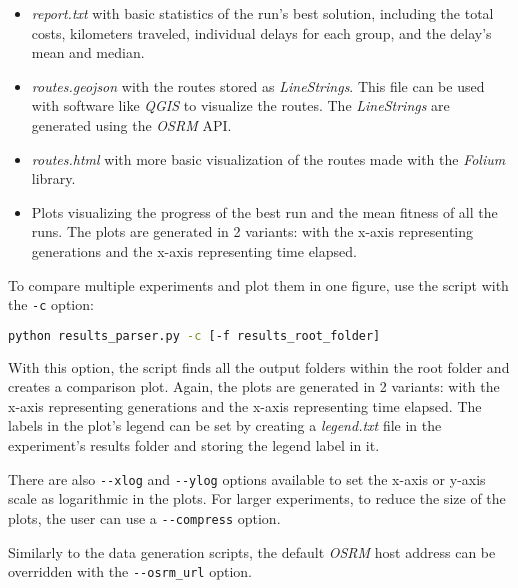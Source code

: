 \begin{itemize}
    \setlength\itemsep{0pt}
    \item \textit{report.txt} with basic statistics of the run's best solution, including the total costs, kilometers traveled, individual delays for each group, and the delay's mean and median.
    \item \textit{routes.geojson} with the routes stored as \textit{LineStrings}. This file can be used with software like \textit{QGIS} to visualize the routes. The \textit{LineStrings} are generated using the \textit{OSRM} API.
    \item \textit{routes.html} with more basic visualization of the routes made with the \textit{Folium} library.
    \item Plots visualizing the progress of the best run and the mean fitness of all the runs. The plots are generated in 2 variants: with the x-axis representing generations and the x-axis representing time elapsed.
\end{itemize}

To compare multiple experiments and plot them in one figure, use the script with the \texttt{-c} option:

\begin{lstlisting}[language=bash]
    python results_parser.py -c [-f results_root_folder] 
\end{lstlisting}

With this option, the script finds all the output folders within the root folder and creates a comparison plot. Again, the plots are generated in 2 variants: with the x-axis representing generations and the x-axis representing time elapsed. The labels in the plot's legend can be set by creating a \textit{legend.txt} file in the experiment's results folder and storing the legend label in it.

There are also \texttt{-{}-xlog} and \texttt{-{}-ylog} options available to set the x-axis or y-axis scale as logarithmic in the plots. For larger experiments, to reduce the size of the plots, the user can use a \texttt{-{}-compress} option.

Similarly to the data generation scripts, the default \textit{OSRM} host address can be overridden with the \texttt{-{}-osrm\_url} option.



